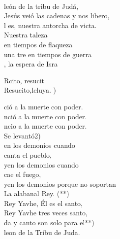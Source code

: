 \begin{cancion}%
	     \chord{(}{**)}{    }\\
	león de la tribu de Judá,\\
	Jesús veió las cadenas y nos libero,\\
	l es, nuestra antorcha de victa.\\
	Nuestra taleza \\
en tiempos de flaqueza \\
	una tre en tiempos de guerra\\
	, la espera de Isra\\
	\begin{chorus}%
	Rcito, resucit \\
	Resucito,leluya. )\\
	\end{chorus}%
	ció a la muerte con poder.\\
	nció a la muerte con poder.\\
	ncio a la muerte con poder.\\
	Se levantó2) \\
	en los demonios cuando \\
canta el pueblo,\\
	yen los demonios cuando \\
cae el fuego,\\
	yen los demonios porque no soportan\\
	La alabanal Rey. (**)\\
	 Rey Yavhe, Él es el santo,\\
	 Rey Yavhe tres veces santo,\\
	da y canto son solo para el**)\\
	leon de la Tribu de Juda.\\
\end{cancion}%
